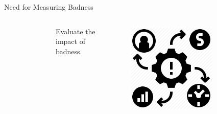 \documentclass[nobackground,dvipsnames,table,aspectratio=169]{beamer}
\begin{document}
\begin{frame}{Need for Measuring Badness}
\begin{columns}[T]
\begin{figure}
            \end{figure}
            \centering
            Evaluate the impact of badness.\\
            \begin{figure}
                \includegraphics[width=0.75\textwidth]{impact-of-badness}
            \end{figure}
    \end{columns}
\end{frame}
\end{document}
